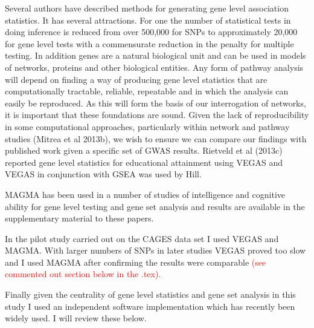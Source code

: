 Several authors have described methods for generating gene level association statistics. It has several attractions. For one the number of statistical tests in doing inference is reduced from over 500,000 for SNPs to approximately 20,000 for gene level tests with a commensurate reduction in the penalty for multiple testing. In addition genes are a natural biological unit and can be used in models of networks, proteins and other biological entities. Any form of pathway analysis will depend on finding a way of producing gene level statistics that are computationally tractable, reliable, repeatable and in which the analysis can easily be reproduced. As this will form the basis of our interrogation of networks, it is important that these foundations are sound. Given the lack of reproducibility in some computational approaches, particularly within network and pathway studies (Mitrea et al 2013b), we wish to ensure we can compare our findings with published work given a specific set of GWAS results.
Rietveld et al (2013c) reported gene level statistics for educational attainment using VEGAS and VEGAS in conjunction with GSEA was used by Hill. 

MAGMA has been used in a number of studies of intelligence and cognitive ability for gene level testing and gene set analysis and results are available in the supplementary material to these papers.

In the pilot study carried out on the CAGES data set I used VEGAS and MAGMA. With larger numbers of SNPs in later studies VEGAS proved too slow and I used MAGMA after confirming the results were comparable \textcolor{red}{(see commented out section below in the .tex).} 


Finally given the centrality of gene level statistics and gene set analysis in this study I used an independent software implementation which has recently been widely used. I will review these below. 




